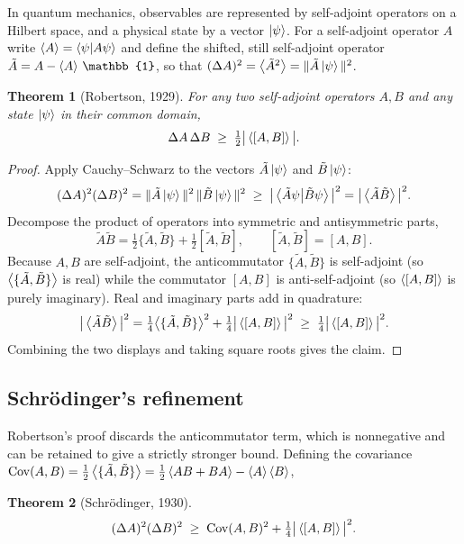 \documentclass[11pt]{article}
\theoremstyle{plain}
\newtheorem{theorem}{Theorem}[section]
\theoremstyle{definition}
\theoremstyle{remark}
\begin{document}
In quantum mechanics, observables are represented by self-adjoint operators on a Hilbert space,
and a physical state by a vector $\ket\psi$. For a self-adjoint operator $A$ write
$\expval{A} = \ip{\psi}{A\psi}$ and define the shifted, still self-adjoint operator
$\tilde A = A - \expval{A}\,\mathbb{1}$, so that $(\Delta A)^2 = \expval{\tilde A^2} =
\|\tilde A \ket\psi\|^2$.

\begin{theorem}[Robertson, 1929]
For any two self-adjoint operators $A,B$ and any state $\ket\psi$ in their common domain,
\[
\Delta A \, \Delta B \;\geq\; \tfrac12 \big|\expval{[A,B]}\big| .
\]
\end{theorem}

\begin{proof}
Apply Cauchy--Schwarz to the vectors $\tilde A\ket\psi$ and $\tilde B\ket\psi$:
\[
(\Delta A)^2(\Delta B)^2 = \|\tilde A\ket\psi\|^2\,\|\tilde B\ket\psi\|^2
\;\geq\; \big|\ip{\tilde A \psi}{\tilde B\psi}\big|^2
= \big|\expval{\tilde A \tilde B}\big|^2 .
\]
Decompose the product of operators into symmetric and antisymmetric parts,
\[
\tilde A \tilde B = \tfrac12\{\tilde A,\tilde B\} + \tfrac12[\tilde A,\tilde B],
\qquad [\tilde A,\tilde B] = [A,B].
\]
Because $A,B$ are self-adjoint, the anticommutator $\{\tilde A,\tilde B\}$ is self-adjoint (so
$\expval{\{\tilde A,\tilde B\}}$ is real) while the commutator $[A,B]$ is anti-self-adjoint (so
$\expval{[A,B]}$ is purely imaginary). Real and imaginary parts add in quadrature:
\[
\big|\expval{\tilde A\tilde B}\big|^2
= \tfrac14\big\langle\{\tilde A,\tilde B\}\big\rangle^2 + \tfrac14\big|\expval{[A,B]}\big|^2
\;\geq\; \tfrac14 \big|\expval{[A,B]}\big|^2 .
\]
Combining the two displays and taking square roots gives the claim.
\end{proof}

\subsection{Schr\"odinger's refinement}

Robertson's proof discards the anticommutator term, which is nonnegative and can be retained to
give a strictly stronger bound. Defining the covariance
$\operatorname{Cov}(A,B) = \tfrac12\expval{\{\tilde A,\tilde B\}} =
\tfrac12\expval{AB+BA} - \expval{A}\expval{B}$,

\begin{theorem}[Schr\"odinger, 1930]
\[
(\Delta A)^2(\Delta B)^2 \;\geq\; \operatorname{Cov}(A,B)^2 + \tfrac14\big|\expval{[A,B]}\big|^2 .
\]
\end{theorem}
\end{document}
